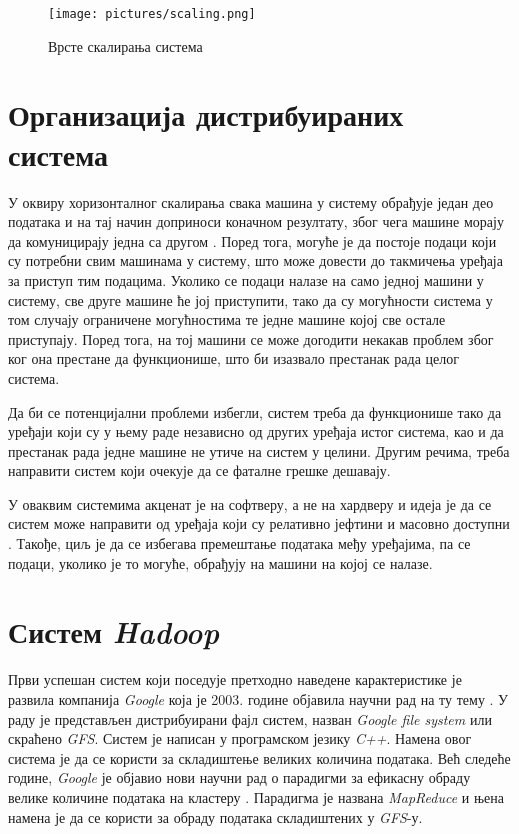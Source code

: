 \documentclass[12pt,oneside]{memoir}
\begin{document}
\begin{figure}[!ht]
  \centering
  \texttt{[image: pictures/scaling.png]}
  \caption{Врсте скалирања система}
  \label{fig:skaliranje}
\end{figure}

\section{Организација дистрибуираних система}
\label{sec:scaling_osobine}

У оквиру хоризонталног скалирања свака машина у систему обрађује један део података и на тај начин доприноси коначном резултату, због чега машине морају да комуницирају једна са другом \cite{hadoop_beginner}. Поред тога, могуће је да постоје подаци који су потребни свим машинама у систему, што може довести до такмичења уређаја за приступ тим подацима. Уколико се подаци налазе на само једној машини у систему, све друге машине ће јој приступити, тако да су могућности система у том случају ограничене могућностима те једне машине којој све остале приступају. Поред тога, на тој машини се може догодити некакав проблем због ког она престане да функционише, што би изазвало престанак рада целог система.

Да би се потенцијални проблеми избегли, систем треба да функционише тако да уређаји који су у њему раде независно од других уређаја истог система, као и да престанак рада једне машине не утиче на систем у целини. Другим речима, треба направити систем који очекује да се фаталне грешке дешавају. 

У оваквим системима акценат је на софтверу, а не на хардверу и идеја је да се систем може направити од уређаја који су релативно јефтини и масовно доступни \cite{hadoop_beginner}. Такође, циљ је да се избегава премештање података међу уређајима, па се подаци, уколико је то могуће, обрађују на машини на којој се налазе.

\section{Систем \textit{Hadoop}}
\label{sec:hadoop}

Први успешан систем који поседује претходно наведене карактеристике је развила компанија \textit{Google} која је 2003. године објавила научни рад на ту тему \cite{gfs}. У раду је представљен дистрибуирани фајл систем, назван \textit{Google file system} или скраћено \textit{GFS}. Систем је написан у програмском језику \textit{C++}. Намена овог система је да се користи за складиштење великих количина података. Већ следеће године, \textit{Google} је објавио нови научни рад о парадигми за ефикасну обраду велике количине података на кластеру \cite{gmr}. Парадигма је названа \textit{MapReduce} и њена намена је да се користи за обраду података складиштених у \textit{GFS}-у.
\end{document}
